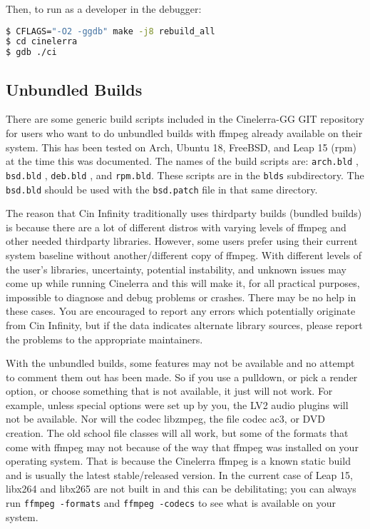 Then, to run as a developer in the debugger:

\begin{lstlisting}[language=bash,numbers=none]
$ CFLAGS="-O2 -ggdb" make -j8 rebuild_all
$ cd cinelerra
$ gdb ./ci
\end{lstlisting}


\subsection{Unbundled Builds}%
\label{sub:unbundled_builds}

There are some generic build scripts included in the Cinelerra-GG GIT repository for users who want to do unbundled builds with ffmpeg already available on their system.  
This has been tested on Arch, Ubuntu 18, FreeBSD, and Leap 15 (rpm) at the time this was documented.  
The names of the build scripts are:  \texttt{arch.bld} ,  \texttt{bsd.bld} , \texttt{deb.bld} , and \texttt{rpm.bld}.  
These scripts are in the \texttt{blds} subdirectory.  
The \texttt{bsd.bld} should be used with the \texttt{bsd.patch} file in that same directory.

The reason that Cin Infinity traditionally uses thirdparty builds (bundled builds) is because there are a lot of different distros with varying levels of ffmpeg and other needed thirdparty libraries.  
However, some users prefer using their current system baseline without another/different copy of ffmpeg.  
With different levels of the user’s libraries, uncertainty, potential instability, and unknown issues may come up while running Cinelerra and this will make it, for all practical purposes, impossible to diagnose and debug problems or crashes.  
There may be no help in these cases.  You are encouraged to report any errors which potentially originate from Cin Infinity, but if the data indicates alternate library sources, please report the problems to the appropriate maintainers.

With the unbundled builds, some features may not be available and no attempt to comment them out has been made.  
So if you use a pulldown, or pick a render option, or choose something that is not available, it just will not work.  
For example, unless special options were set up by you, the LV2 audio plugins will not be available.  
Nor will the codec libzmpeg, the file codec ac3, or DVD creation.  
The old school file classes will all work, but some of the formats that come with ffmpeg may not because of the way that ffmpeg was installed on your operating system.  
That is because the Cinelerra ffmpeg is a known static build and is usually the latest stable/released version.  
In the current case of Leap 15, libx264 and libx265 are not built in and this can be debilitating; you can always run \texttt{ffmpeg -formats} and \texttt{ffmpeg -codecs} to see what is available on your system.


